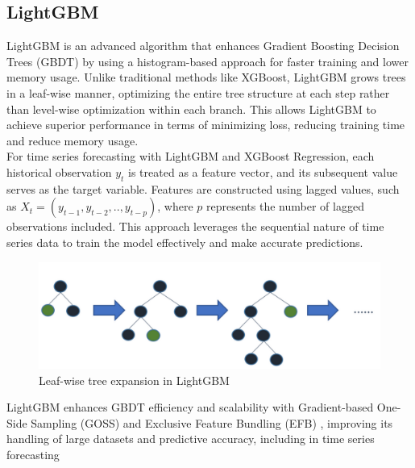 \documentclass{ieeeojies}
\begin{document}
\subsection{LightGBM}
LightGBM is an advanced algorithm that enhances Gradient Boosting Decision Trees (GBDT) by using a histogram-based approach for faster training and lower memory usage. Unlike traditional methods like XGBoost, LightGBM grows trees in a leaf-wise manner, optimizing the entire tree structure at each step rather than level-wise optimization within each branch. This allows LightGBM to achieve superior performance in terms of minimizing loss, reducing training time and reduce memory usage.\\
For time series forecasting with LightGBM and XGBoost Regression, each historical observation \(y_t\) is treated as a feature vector, and its subsequent value serves as the target variable. Features are constructed using lagged values, such as \(X_t = (y_{t-1}, y_{t-2},..,y_{t-p})\), where \(p\) represents the number of lagged observations included. This approach leverages the sequential nature of time series data to train the model effectively and make accurate predictions.\\
\begin{figure}[H]
    \centering
    \includegraphics[width=0.8\linewidth]{./image/LightGBM.png}
    \caption{Leaf-wise tree expansion in LightGBM}
    \label{fig:11}
\end{figure}
\noindent
LightGBM enhances GBDT efficiency and scalability with Gradient-based One-Side Sampling (GOSS) and Exclusive Feature Bundling (EFB) \cite{b9}, improving its handling of large datasets and predictive accuracy, including in time series forecasting\\
\end{document}
